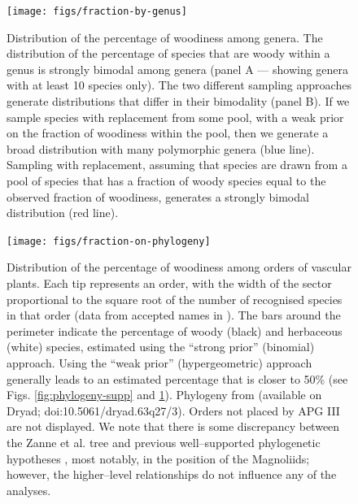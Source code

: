 \documentclass[a4paper,12pt]{article}
\begin{document}



\begin{figure}[p]
  \centering
  \texttt{[image: figs/fraction-by-genus]}
  \caption{Distribution of the percentage of woodiness among genera.
    The distribution of the percentage of species that are woody within
    a genus is strongly bimodal among genera (panel A --- showing
    genera with at least 10 species only).
    The two different sampling approaches generate distributions that
    differ in their bimodality (panel B). If we sample species
    with replacement from some pool, with a weak prior on
    the fraction of woodiness within the pool, then we generate a broad
    distribution with many polymorphic genera (blue line).
    Sampling with replacement, assuming that species are drawn from a
    pool of species that has a fraction of woody species equal to the
    observed fraction of woodiness, generates a strongly bimodal
    distribution (red line).}
  \label{fig:distribution-genera}
\end{figure}

\begin{figure}[p]
  \centering
  \texttt{[image: figs/fraction-on-phylogeny]}
  \caption{Distribution of the percentage of woodiness among orders of
    vascular plants.  Each tip represents an order, with the width of
    the sector proportional to the square root of the number of
    recognised species in that order (data from accepted names in
    \citet{ThePlantList}).  The bars around the perimeter indicate the
    percentage of woody (black) and herbaceous (white) species,
    estimated using the ``strong prior'' (binomial) approach.  Using
    the ``weak prior'' (hypergeometric) approach generally leads to an
    estimated percentage that is closer to 50\% (see Figs.
    \ref{fig:phylogeny-supp} and \ref{fig:distribution-genera}).
    Phylogeny from \citet{Zanne} (available on Dryad; 
    doi:10.5061/dryad.63q27/3). Orders not placed by APG III
    \citep{APG3} are not displayed. We note that there is some discrepancy between
    the Zanne et al. tree and previous well--supported
    phylogenetic hypotheses \citep[e.g.,][]{Soltis2011}, most notably, in the
    position of the Magnoliids; however, the higher--level relationships 
    do not influence any of the analyses.}
\label{fig:phylogeny}
\end{figure}
\end{document}
